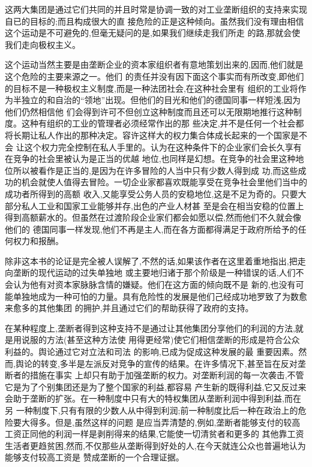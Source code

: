 ﻿\documentclass[12pt]{article}
\begin{document}
这两大集团是通过它们共同的并且时常是协调一致的对工业垄断组织的支持来实现自已的目标的;而且构成很大的直
接危险的正是这种倾向。虽然我们没有理由相信这个运动是不可避免的,但毫无疑问的是,如果我们继续走我们所走
的路,那就会使我们走向极权主义。

这个运动当然主要是由垄断企业的资本家组织者有意地策划出来的,因而,他们就是这个危险的主要来源之一。他们
的责任并没有因下面这个事实而有所改变,即他们的目标不是一种极权主义制度,而是一种法团社会,在这种社会里有
组织的工业将作为半独立的和自治的``领地''出现。但他们的目光和他们的德国同事一样短浅,因为他们仍然相信他
们会得到许可不但创立这种制度而且还可以无限期地推行这种制度。这种有组织的工业的管理者必须经常作出的那
些决定,并不是任何一个社会都将长期让私人作出的那种决定。容许这样大的权力集合体成长起来的一个国家是不会
让这个权力完全控制在私人手里的。认为在这种条件下的企业家们会长久享有在竞争的社会里被认为是正当的优越
地位,也同样是幻想。在竞争的社会里这种地位所以被看作是正当的,是因为在许多冒险的人当中只有少数人得到成
功,而这些成功的机会就使人值得去冒险。一切企业家都喜欢既能享受在竞争社会里他们当中的成功者所得到的高额
收入,又能享受公务人员的安稳地位,这是不足为奇的。只要大部分私人工业和国家工业能够并存,出色的产业人材甚
至是会在相当安稳的位置上得到高额薪水的。但虽然在过渡阶段企业家们都会如愿以偿,然而他们不久就会像他们的
德国同事一样发现,他们不再是主人,而在各方面都得满足于政府所给予的任何权力和报酬。

除非这本书的论证是完全被人误解了,不然的话,如果该作者在这里着重地指出,把走向垄断的现代运动的过失单独地
或主要地归诸于那个阶级是一种错误的话,人们不会认为他有对资本家脉脉含情的嫌疑。他们在这方面的倾向既不是
新的,也没有可能单独地成为一种可怕的力量。具有危险性的发展是他们己经成功地罗致了为数愈来愈多的其他集团
的拥护,并且通过它们的帮助获得了政府的支持。

在某种程度上,垄断者得到这种支持不是通过让其他集团分享他们的利润的方法,就是用说服的方法(甚至这种方法使
用得更经常)使它们相信垄断的形成是符合公众利益的。舆论通过它对立法和司法 的影响,已成为促成这种发展的最
重要因素。然而,舆论的转变,多半是左派反对竞争的宣传的结果。在许多情况下,甚至旨在反对垄断者的措施在事实
上却只有助于加强垄断的权力。对垄断利润的每一次袭击,不管它是为了个别集团还是为了整个国家的利益,都容易
产生新的既得利益,它又反过来会助于垄断的扩张。在一种制度中只有大的特权集团从垄断利润中得到利益,而在另
一种制度下,只有有限的少数人从中得到利润;前一种制度比后一种在政治上的危险要大得多。但是,虽然这样的问题
是应当弄清楚的,例如,垄断者能够支付的较高工资正同他的利润一样是剥削得来的结果,它能使一切清贫者和更多的
其他靠工资生活者更趋贫困,然而,不仅那些从垄断得到好处的人,在今天就连公众也普遍地认为能够支付较高工资是
赞成垄断的一个合理证据。
\end{document}
